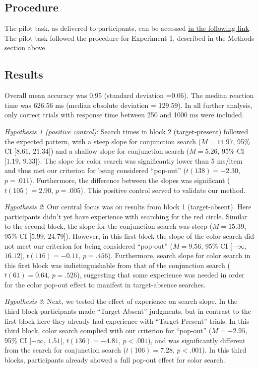 \documentclass[
  english,
  man]{apa6}
\begin{document}
\hypertarget{procedure}{%
\subsection{Procedure}\label{procedure}}

The pilot task, as delivered to participants, can be accessed \href{http://167.99.93.4/publix/30/start?batchId=51\&generalMultiple}{in the following link}.
The pilot task followed the procedure for Experiment 1, described in the Methods section above.

\hypertarget{results}{%
\subsection{Results}\label{results}}

Overall mean accuracy was 0.95 (standard deviation =0.06). The median reaction time was 626.56 ms (median obsolute deviation = 129.59). In all further analysis, only correct trials with response time between 250 and 1000 ms were included.

\emph{Hypothesis 1 (positive control)}: Search times in block 2 (target-present) followed the expected pattern, with a steep slope for conjunction search (\(M = 14.97\), 95\% CI \([8.61\), \(21.34]\)) and a shallow slope for conjunction search (\(M = 5.26\), 95\% CI \([1.19\), \(9.33]\)). The slope for color search was significantly lower than 5 ms/item and thus met our criterion for being considered \enquote{pop-out} (\(t(138) = -2.30\), \(p = .011\)). Furthermore, the difference between the slopes was significant (\(t(105) = 2.90\), \(p = .005\)). This positive control served to validate our method.

\emph{Hypothesis 2}: Our central focus was on results from block 1 (target-absent). Here participants didn't yet have experience with searching for the red circle. Similar to the second block, the slope for the conjunction search was steep (\(M = 15.39\), 95\% CI \([5.99\), \(24.79]\)). However, in this first block the slope of the color search did not meet our criterion for being considered \enquote{pop-out} (\(M = 9.56\), 95\% CI \([-\infty\), \(16.12]\), \(t(116) = -0.11\), \(p = .456\)). Furthermore, search slope for color search in this first block was indistinguishable from that of the conjunction search (\(t(61) = 0.64\), \(p = .526\)), suggesting that some experience was needed in order for the color pop-out effect to manifest in target-absence searches.

\emph{Hypothesis 3}: Next, we tested the effect of experience on search slope. In the third block participants made \enquote{Target Absent} judgments, but in contrast to the first block here they already had experience with \enquote{Target Present} trials. In this third block, color search complied with our criterion for \enquote{pop-out} (\(M = -2.95\), 95\% CI \([-\infty\), \(1.51]\), \(t(136) = -4.81\), \(p < .001\)), and was significantly different from the search for conjunction search (\(t(106) = 7.28\), \(p < .001\)). In this third blocks, participants already showed a full pop-out effect for color search.
\end{document}
